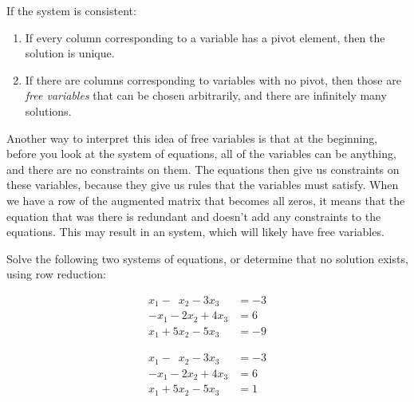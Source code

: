\documentclass{ximera}
\begin{document}
If the system is consistent:
\begin{enumerate}
    \item If every column corresponding to a variable has a pivot element, then the solution is unique.
    \item If there are columns corresponding to variables with no pivot, then those are \emph{free variables} that can be chosen arbitrarily, and there are infinitely many solutions.
\end{enumerate}

Another way to interpret this idea of free variables is that at the beginning, before you look at the system of equations, all of the variables can be anything, and there are no constraints on them. The equations then give us constraints on these variables, because they give us rules that the variables must satisfy. When we have a row of the augmented matrix that becomes all zeros, it means that the equation that was there is redundant and doesn't add any constraints to the equations. This may result in an \emph{} system, which will likely have free variables.

\begin{example}
    Solve the following two systems of equations, or determine that no solution exists, using row reduction:
    
    \begin{equation*}
        \begin{split}
            x_1 - \phantom{9} x_2 - 3x_3 & = -3 \\
            -x_1 - 2x_2 + 4x_3 &= 6 \\
            x_1 + 5x_2 - 5x_3 &= -9
        \end{split}
    \end{equation*}
    
    \begin{equation*}
        \begin{split}
            x_1 - \phantom{9} x_2 - 3x_3 & = -3 \\
            -x_1 - 2x_2 + 4x_3 &= 6 \\
            x_1 + 5x_2 - 5x_3 &= 1
        \end{split}
    \end{equation*}

\end{example}
\end{document}

